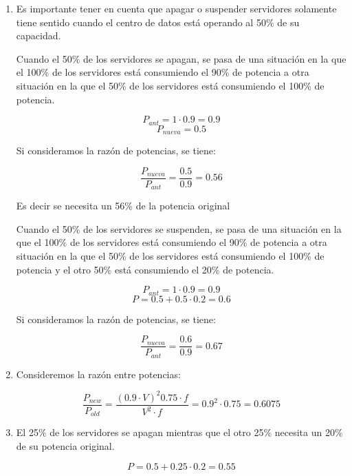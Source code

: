 \begin{enumerate}

\item Es importante tener en cuenta que apagar o suspender servidores solamente 
tiene sentido cuando el centro de datos está operando al 50\% de su capacidad.

Cuando el 50\% de los servidores se apagan, se pasa de una situación en la que
el 100\% de los servidores está consumiendo el 90\% de potencia a otra situación
en la que el 50\% de los servidores está consumiendo el 100\% de potencia.

\[P_{ant} = 1 \cdot 0.9 = 0.9\]
\[P_{nueva} = 0.5\]

Si consideramos la razón de potencias, se tiene:

\[\frac{P_{nueva}}{P_{ant}} = \frac{0.5}{0.9} = 0.56\]

Es decir se necesita un 56\% de la potencia original

Cuando el 50\% de los servidores se suspenden, se pasa de una situación en la que el
100\% de los servidores está consumiendo el 90\% de potencia a otra situación en la
que el 50\% de los servidores está consumiendo el 100\% de potencia y el otro
50\% está consumiendo el 20\% de potencia.

\[P_{ant} = 1 \cdot 0.9 = 0.9\]
\[P = 0.5 + 0.5 \cdot 0.2 = 0.6\]

Si consideramos la razón de potencias, se tiene:

\[\frac{P_{nueva}}{P_{ant}} = \frac{0.6}{0.9} = 0.67\] 

\item Consideremos la razón entre potencias:

\[
\frac{P_{new}}{P_{old}} =
\frac{(0.9 \cdot V)^2 0.75 \cdot f}{V^2 \cdot f} =
0.9^2 \cdot 0.75 =
0.6075
\]

\item El 25\% de los servidores se apagan mientras que el otro 25\%
necesita un 20\% de su potencia original.

\[
P = 0.5 + 0.25 \cdot 0.2 = 0.55
\]

\end{enumerate}

